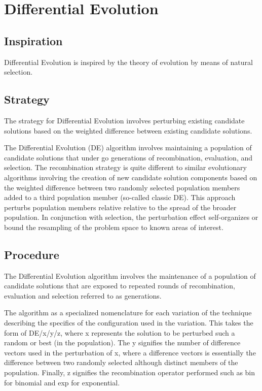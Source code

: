 \section{Differential Evolution}

\subsection{Inspiration}
Differential Evolution is inspired by the theory of evolution by means of natural selection.

\subsection{Strategy}
The strategy for Differential Evolution involves perturbing existing candidate solutions based on the weighted difference between existing candidate solutions.

The Differential Evolution (DE) algorithm involves maintaining a population of candidate solutions that under go generations of recombination, evaluation, and selection. The recombination strategy is quite different to similar evolutionary algorithms involving the creation of new candidate solution components based on the weighted difference between two randomly selected population members added to a third population member (so-called classic DE). This approach perturbs population members relative relative to the spread of the broader population. In conjunction with selection, the perturbation effect self-organizes or bound the resampling of the problem space to known areas of interest.

\subsection{Procedure}
The Differential Evolution algorithm involves the maintenance of a population of candidate solutions that are exposed to repeated rounds of recombination, evaluation and selection referred to as generations. 

The algorithm as a specialized nomenclature for each variation of the technique describing the specifics of the configuration used in the variation. This takes the form of DE/x/y/z, where x represents the solution to be perturbed such a random or best (in the population). The y signifies the number of difference vectors used in the perturbation of x, where a difference vectors is essentially the difference between two randomly selected although distinct members of the population. Finally, z signifies the recombination operator performed such as bin for binomial and exp for exponential. 

